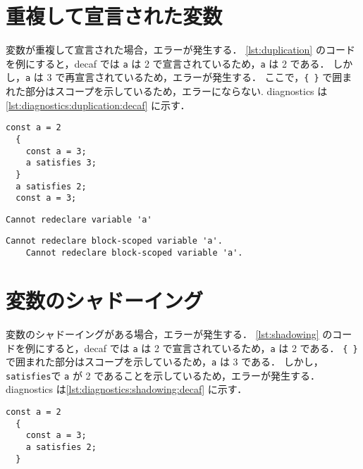 \section{重複して宣言された変数}

変数が重複して宣言された場合，エラーが発生する．
\ref{lst:duplication} のコードを例にすると，decaf では \texttt{a} は 2 で宣言されているため，\texttt{a} は 2 である．
しかし，\texttt{a} は 3 で再宣言されているため，エラーが発生する．
ここで，\texttt{\{ \}} で囲まれた部分はスコープを示しているため，エラーにならない.
diagnostics は\ref{lst:diagnostics:duplication:decaf} に示す．

\begin{lstlisting}[caption=重複して宣言された変数の例, label=lst:duplication]
  const a = 2
  {
  	const a = 3;
  	a satisfies 3;
  }
  a satisfies 2;
  const a = 3;
\end{lstlisting}

\begin{minipage}{0.45\textwidth}
    \begin{lstlisting}[caption=decaf の diagnostics, label=lst:diagnostics:duplication:decaf]
    Cannot redeclare variable 'a'
  \end{lstlisting}
\end{minipage}
\hfill
\begin{minipage}{0.45\textwidth}
    \begin{lstlisting}[caption=tsc の diagnostics, label=lst:diagnostics:duplication:tsc]
    Cannot redeclare block-scoped variable 'a'.
    Cannot redeclare block-scoped variable 'a'.
  \end{lstlisting}
\end{minipage}

\section{変数のシャドーイング}

変数のシャドーイングがある場合，エラーが発生する．
\ref{lst:shadowing} のコードを例にすると，decaf では \texttt{a} は 2 で宣言されているため，\texttt{a} は 2 である．
\texttt{\{ \}} で囲まれた部分はスコープを示しているため，\texttt{a} は 3 である．
しかし，\texttt{satisfies}で \texttt{a} が 2 であることを示しているため，エラーが発生する．
diagnostics は\ref{lst:diagnostics:shadowing:decaf} に示す．

\begin{lstlisting}[caption=変数のシャドーイングの例, label=lst:shadowing]
  const a = 2
  {
  	const a = 3;
  	a satisfies 2;
  }
\end{lstlisting}

